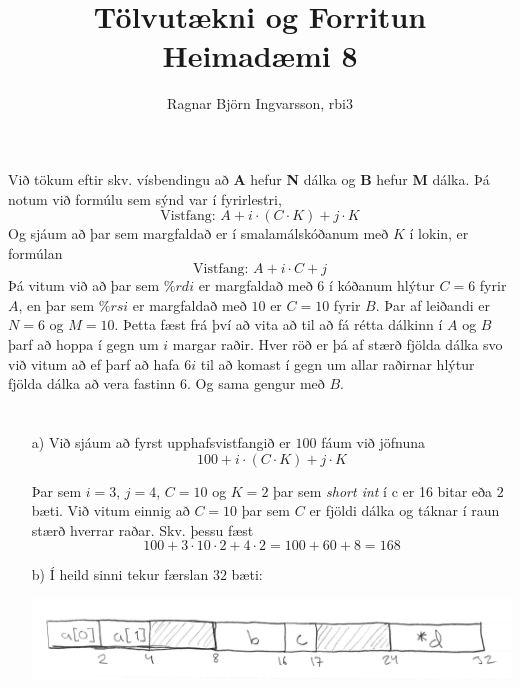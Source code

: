 \documentclass{article}
\title{Tölvutækni og Forritun Heimadæmi 8 }
\author{Ragnar Björn Ingvarsson, rbi3}
\begin{document}
\renewcommand\thepage{}

	\maketitle

	\newpage
	\setcounter{page}{1}
	\renewcommand\thepage{\arabic{page}}

	\section{}
	Við tökum eftir skv. vísbendingu að \textbf{A} hefur \textbf{N } dálka 
	og \textbf{B} hefur \textbf{M} dálka. Þá notum við formúlu sem sýnd 
	var í fyrirlestri, 
	\begin{equation}
		\text{Vistfang: } A + i \cdot (C \cdot K) + j \cdot K
		\label{eq:Aðgangur í 16x16 fylki}
	\end{equation}
	Og sjáum að þar sem margfaldað er í smalamálskóðanum með $K$ í lokin, 
	er formúlan
	\begin{equation}
		\text{Vistfang: } A + i \cdot C + j
		\label{eq:adjusted}
	\end{equation}
	Þá vitum við að þar sem $\%rdi$ er margfaldað með $6$ í kóðanum hlýtur 
	$C = 6$ fyrir $A$, en þar sem $\%rsi$ er margfaldað með $10$ er $C = 10$ 
	fyrir $B$. Þar af leiðandi er $N = 6$ og $M = 10$. Þetta fæst frá 
	því að vita að til að fá rétta dálkinn í $A$ og $B$ þarf að hoppa í 
	gegn um $i$ margar raðir. Hver röð er þá af stærð fjölda dálka svo við 
	vitum að ef þarf að hafa $6i$ til að komast í gegn um allar raðirnar 
	hlýtur fjölda dálka að vera fastinn $6$. Og sama gengur með $B$.

	\section{}
	\begin{itemize}
		\item[a)] Við sjáum að fyrst upphafsvistfangið er $100$ fáum við 
			jöfnuna
			\begin{equation}
				100 + i\cdot (C\cdot K) + j\cdot K
				\label{eq:gamer}
			\end{equation}

			Þar sem $i = 3$, $j = 4$, $C = 10$ og $K = 2$ þar sem 
			\textit{short int }í c er 16 bitar eða $2$ bæti. Við vitum 
			einnig að $C = 10$ þar sem $C$ er fjöldi dálka og táknar í raun 
			stærð hverrar raðar. Skv. þessu fæst
			\begin{equation}
				100 + 3\cdot 10\cdot 2 + 4\cdot 2= 100 + 60 + 8 = 168
				\label{eq:gamer1}
			\end{equation}
		\item[b)] Í heild sinni tekur færslan $32$ bæti:

			\begin{center}
				\includegraphics[scale=0.11]{gmaer.jpg}
			\end{center}
	\end{itemize}
	
\end{document}
